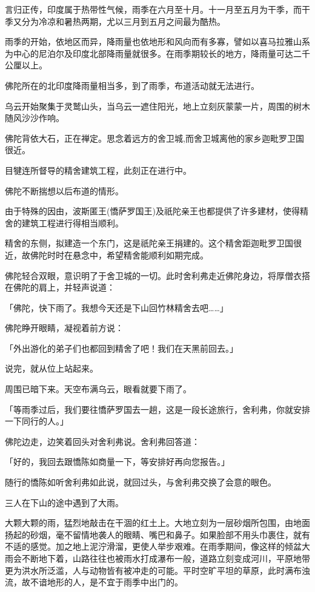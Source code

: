 \documentclass[twoside,openany]{book}
\begin{document}
言归正传，印度属于热带性气候，雨季在六月至十月。十一月至五月为干季，而干季又分为冷凉和暑热两期，尤以三月到五月之间最为酷热。

雨季的开始，依地区而异，降雨量也依地形和风向而有多寡，譬如以喜马拉雅山系为中心的尼泊尔及印度北部降雨量就很多。在雨季期较长的地方，降雨量可达二千公厘以上。

佛陀所在的北印度降雨量相当多，到了雨季，布道活动就无法进行。

乌云开始聚集于灵鹫山头，当乌云一遮住阳光，地上立刻灰蒙蒙一片，周围的树木随风沙沙作响。

佛陀背依大石，正在禅定。思念着远方的舍卫城,而舍卫城离他的家乡迦毗罗卫国很近。

目犍连所督导的精舍建筑工程，此刻正在进行中。

佛陀不断揣想以后布道的情形。

由于特殊的因由，波斯匿王(憍萨罗国王)及祇陀亲王也都提供了许多建材，使得精舍的建筑工程进行得相当顺利。

精舍的东侧，拟建造一个东门，这是祇陀亲王捐建的。这个精舍距迦毗罗卫国很近，故佛陀时时在悬念中，希望精舍能顺利如期完成。

佛陀轻合双眼，意识明了于舍卫城的一切。此时舍利弗走近佛陀身边，将厚僧衣搭在佛陀的肩上，并轻声说道：

「佛陀，快下雨了。我想今天还是下山回竹林精舍去吧……」

佛陀睁开眼睛，凝视着前方说：

「外出游化的弟子们也都回到精舍了吧！我们在天黑前回去。」

说完，就从位上站起来。

周围已暗下来。天空布满乌云，眼看就要下雨了。

「等雨季过后，我们要往憍萨罗国去一趟，这是一段长途旅行，舍利弗，你就安排一下同行的人。」

佛陀边走，边笑着回头对舍利弗说。舍利弗回答道：

「好的，我回去跟憍陈如商量一下，等安排好再向您报告。」

随行的憍陈如听舍利弗如此说，就回过头，与舍利弗交换了会意的眼色。

三人在下山的途中遇到了大雨。

大颗大颗的雨，猛烈地敲击在干涸的红土上。大地立刻为一层砂烟所包围，由地面扬起的砂烟，毫不留情地袭人的眼睛、嘴巴和鼻子。如果脸部不用头巾裹住，就有不适的感觉。加之地上泥泞滑溜，更使人举步艰难。在雨季期间，像这样的倾盆大雨会不断地下着，山路往往也被雨水打成瀑布一般，道路立刻变成河川，平原地带更为洪水所泛滥，人与动物皆有被冲走的可能。平时空旷平坦的草原，此时满布浊流，故不谙地形的人，是不宜于雨季中出门的。
\end{document}
